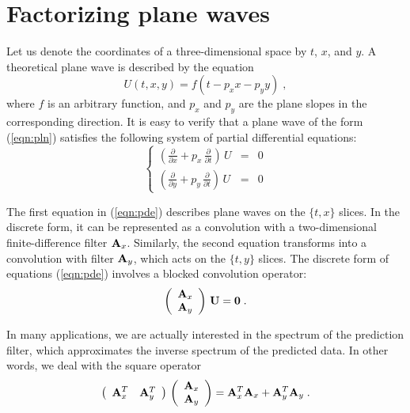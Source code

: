 \section{Factorizing plane waves}

Let us denote the coordinates of a three-dimensional space by $t$,
$x$, and $y$.  A theoretical plane wave is described by the equation
\begin{equation}
\label{eqn:pln}
U(t,x,y) = f (t - p_x x - p_y y)\;,
\end{equation}
where $f$ is an arbitrary function, and $p_x$ and $p_y$ are the plane
slopes in the corresponding direction. It is easy to verify that a
plane wave of the form (\ref{eqn:pln}) satisfies the following system
of partial differential equations:
\begin{equation}
\label{eqn:pde}
\left\{\begin{array}{rcl}\displaystyle
\left(\frac{\partial}{\partial x} + p_x\,\frac{\partial}{\partial t}\right)\,U
& = & 0 \\ \displaystyle
\left(\frac{\partial}{\partial y} + p_y\,\frac{\partial}{\partial t}\right)\,U
& = & 0
\end{array}\right.
\end{equation}
\par
The first equation in (\ref{eqn:pde}) describes plane waves on the
$\{t,x\}$ slices.  In the discrete form, it can be represented as a
convolution with a two-dimensional finite-difference filter
$\bold{A}_x$. Similarly, the second equation transforms into a
convolution with filter $\bold{A}_y$, which acts on the $\{t,y\}$
slices. The discrete form of equations (\ref{eqn:pde}) involves a
blocked convolution operator:
\begin{equation}
\label{eqn:cnv}
\left(\begin{array}{c}\displaystyle
\bold{A}_x \\
\bold{A}_y
\end{array}\right)\,\bold{U} = \bold{0}\;.
\end{equation}
\par
In many applications, we are actually interested in the spectrum of
the prediction filter, which approximates the inverse spectrum of the
predicted data. In other words, we deal with the square operator
\begin{equation}
\label{eqn:ata}
\left(\begin{array}{cc}\displaystyle \bold{A}_x^T & \bold{A}_y^T
      \end{array}\right)\,
\left(\begin{array}{c}\displaystyle
\bold{A}_x \\
\bold{A}_y
\end{array}\right) = 
\bold{A}_x^T \bold{A}_x + \bold{A}_y^T \bold{A}_y\;.
\end{equation}
